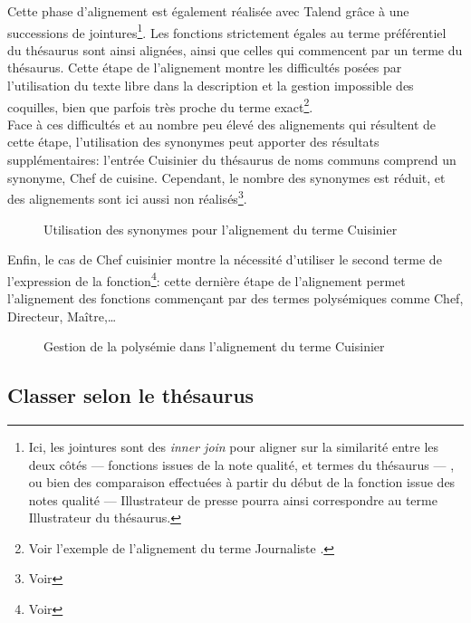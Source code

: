 Cette phase d'alignement est également réalisée avec Talend grâce à une successions de jointures\footnote{Ici, les jointures sont des \textit{inner join} pour aligner sur la similarité entre les deux côtés --- fonctions issues de la note qualité, et termes du thésaurus --- , ou bien des comparaison effectuées à partir du début de la fonction issue des notes qualité --- \og Illustrateur de presse\fg{} pourra ainsi correspondre au terme \og Illustrateur\fg{} du thésaurus.}. Les fonctions strictement égales au terme préférentiel du thésaurus sont ainsi alignées, ainsi que celles qui commencent par un terme du thésaurus. Cette étape de l'alignement montre les difficultés posées par l'utilisation du texte libre dans la description et la gestion impossible des coquilles, bien que parfois très proche du terme exact\footnote{Voir l'exemple de l'alignement du terme \og Journaliste\fg{} .}.\\

Face à ces difficultés et au nombre peu élevé des alignements qui résultent de cette étape, l'utilisation des synonymes peut apporter des résultats supplémentaires: l'entrée \og Cuisinier\fg{} du thésaurus de noms communs comprend un synonyme, \og Chef de cuisine\fg{}. Cependant, le nombre des synonymes est réduit, et des alignements sont ici aussi non réalisés\footnote{Voir }.
\begin{figure}[!h]
	\centering
	\caption{Utilisation des synonymes pour l'alignement du terme \og Cuisinier\fg{}}
	\label{alignement_cuisinier}
\end{figure}

Enfin, le cas de \og Chef cuisinier\fg{} montre la nécessité d'utiliser le second terme de l'expression de la fonction\footnote{Voir }: cette dernière étape de l'alignement permet l'alignement des fonctions commençant par des termes polysémiques comme \og Chef\fg{}, \og Directeur\fg{}, \og Maître\fg{},\dots
\begin{figure}[!h]
	\centering
	\caption{Gestion de la polysémie dans l'alignement du terme \og Cuisinier\fg{}}
	\label{alignement_cuisinier_polysemie}
\end{figure}

\subsection{\label{I-C-3-c}Classer selon le thésaurus}

